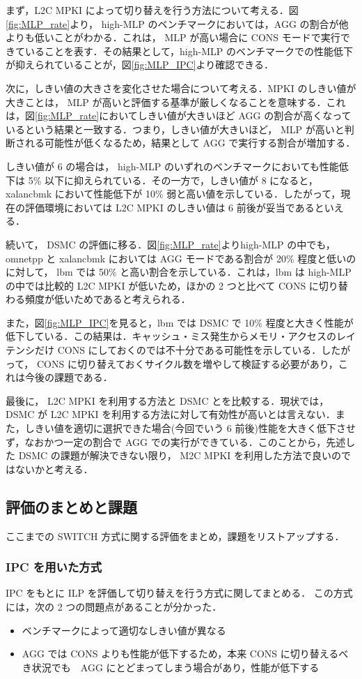 \documentclass[twocolumn]{jsarticle}
\begin{document}
  まず，L2C MPKI によって切り替えを行う方法について考える．図\ref{fig:MLP_rate}より， high-MLP のベンチマークにおいては，AGG の割合が他よりも低いことがわかる．これは， MLP が高い場合に CONS モードで実行できていることを表す．その結果として，high-MLP のベンチマークでの性能低下が抑えられていることが，図\ref{fig:MLP_IPC}より確認できる．

  次に，しきい値の大きさを変化させた場合について考える．MPKI のしきい値が大きことは， MLP が高いと評価する基準が厳しくなることを意味する．これは，図\ref{fig:MLP_rate}においてしきい値が大きいほど AGG の割合が高くなっているという結果と一致する．つまり，しきい値が大きいほど， MLP が高いと判断される可能性が低くなるため，結果として AGG で実行する割合が増加する．

  しきい値が 6 の場合は， high-MLP のいずれのベンチマークにおいても性能低下は 5\% 以下に抑えられている．その一方で，しきい値が 8 になると， xalancbmk において性能低下が 10\% 弱と高い値を示している．したがって，現在の評価環境においては L2C MPKI のしきい値は 6 前後が妥当であるといえる．

  続いて， DSMC の評価に移る．図\ref{fig:MLP_rate}よりhigh-MLP の中でも， omnetpp と xalancbmk においては AGG モードである割合が 20\% 程度と低いのに対して， lbm では
  50\% と高い割合を示している．これは，lbm は high-MLP の中では比較的 L2C MPKI が低いため，ほかの 2 つと比べて CONS に切り替わる頻度が低いためであると考えられる．

  また，図\ref{fig:MLP_IPC}を見ると，lbm では DSMC で 10\% 程度と大きく性能が低下している．この結果は．キャッシュ・ミス発生からメモリ・アクセスのレイテンシだけ CONS にしておくのでは不十分である可能性を示している．したがって， CONS に切り替えておくサイクル数を増やして検証する必要があり，これは今後の課題である．

  最後に， L2C MPKI を利用する方法と DSMC とを比較する．現状では， DSMC が L2C MPKI を利用する方法に対して有効性が高いとは言えない．また，しきい値を適切に選択できた場合(今回でいう 6 前後)性能を大きく低下させず，なおかつ一定の割合で AGG での実行ができている．このことから，先述した DSMC の課題が解決できない限り， M2C MPKI を利用した方法で良いのではないかと考える．

  \subsection{評価のまとめと課題}
  ここまでの SWITCH 方式に関する評価をまとめ，課題をリストアップする．

  \subsubsection{IPC を用いた方式}
  IPC をもとに ILP を評価して切り替えを行う方式に関してまとめる． この方式には，次の 2 つの問題点があることが分かった．
  \begin{itemize}
    \item ベンチマークによって適切なしきい値が異なる
    \item AGG では CONS よりも性能が低下するため，本来 CONS に切り替えるべき状況でも　AGG にとどまってしまう場合があり，性能が低下する
  \end{itemize}
\end{document}
